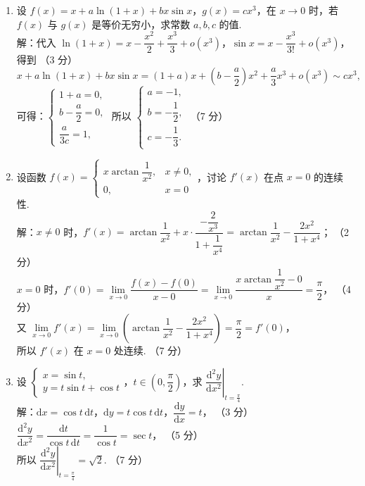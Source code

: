 \documentclass[a4paper,11pt]{ctexart}
\newcommand{\dd}{\mathrm{d}}
\newcommand{\score}[1]{\hfill（#1）}
\begin{document}
\begin{enumerate}[label=\arabic*., start=11, leftmargin=2em, itemsep=1.0em, topsep=0.5em]
  \item 设 $f(x) = x + a\ln(1+x) + bx\sin x$，$g(x) = cx^3$，在 $x\to 0$ 时，若 $f(x)$ 与 $g(x)$ 是等价无穷小，求常数 $a, b, c$ 的值.\\[0.3em]
  解：代入 $\ln(1+x) = x - \dfrac{x^2}{2} + \dfrac{x^3}{3} + o(x^3)$，$\sin x = x - \dfrac{x^3}{3!} + o(x^3)$，得到 \score{3 分}
  \[
    x + a\ln(1+x) + bx\sin x = (1+a)x + \left(b - \frac{a}{2}\right)x^2 + \frac{a}{3}x^3 + o(x^3) \sim cx^3, \tag*{（5 分）}
  \]
  可得：$\begin{cases} 1+a = 0, \\ b - \dfrac{a}{2} = 0, \\ \dfrac{a}{3c} = 1, \end{cases}$ 所以 $\begin{cases} a = -1, \\ b = -\dfrac{1}{2}, \\ c = -\dfrac{1}{3}. \end{cases}$ \score{7 分}

  \item 设函数 $f(x) = \begin{cases} x\arctan\dfrac{1}{x^2}, & x\neq 0, \\[0.4em] 0, & x=0 \end{cases}$，讨论 $f'(x)$ 在点 $x=0$ 的连续性.\\[0.3em]
  解：$x\neq 0$ 时，$f'(x) = \arctan\dfrac{1}{x^2} + x\cdot\dfrac{-\dfrac{2}{x^3}}{1 + \dfrac{1}{x^4}} = \arctan\dfrac{1}{x^2} - \dfrac{2x^2}{1+x^4}$； \score{2 分}\\[0.3em]
  $x = 0$ 时，$f'(0) = \lim\limits_{x\to 0}\dfrac{f(x)-f(0)}{x-0} = \lim\limits_{x\to 0}\dfrac{x\arctan\dfrac{1}{x^2} - 0}{x} = \dfrac{\pi}{2}$， \score{4 分}\\[0.3em]
  又 $\lim\limits_{x\to 0} f'(x) = \lim\limits_{x\to 0}\left(\arctan\dfrac{1}{x^2} - \dfrac{2x^2}{1+x^4}\right) = \dfrac{\pi}{2} = f'(0)$，\\[0.3em]
  所以 $f'(x)$ 在 $x=0$ 处连续. \score{7 分}

  \item 设 $\begin{cases} x = \sin t, \\ y = t\sin t + \cos t \end{cases}$，$t \in \left(0, \dfrac{\pi}{2}\right)$，求 $\left.\dfrac{\dd^2 y}{\dd x^2}\right|_{t=\frac{\pi}{4}}$.\\[0.3em]
  解：$\dd x = \cos t\,\dd t$，$\dd y = t\cos t\,\dd t$，$\dfrac{\dd y}{\dd x} = t$， \score{3 分}\\[0.3em]
  $\dfrac{\dd^2 y}{\dd x^2} = \dfrac{\dd t}{\cos t\,\dd t} = \dfrac{1}{\cos t} = \sec t$， \score{5 分}\\[0.3em]
  所以 $\left.\dfrac{\dd^2 y}{\dd x^2}\right|_{t=\frac{\pi}{4}} = \sqrt{2}$. \score{7 分}


\end{enumerate}
\end{document}
